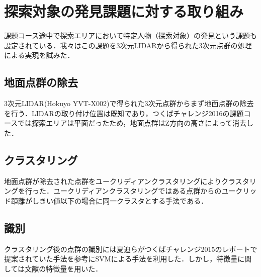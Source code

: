 \documentclass[10pt,a4paper]{jarticle}
\begin{document}
\section{探索対象の発見課題に対する取り組み}
\label{200657_7Dec16}
課題コース途中で探索エリアにおいて特定人物（探索対象）の発見という課題も設定されている．我々はこの課題を3次元LIDARから得られた3次元点群の処理による実現を試みた．

\subsection{地面点群の除去}
3次元LIDAR(Hokuyo YVT-X002)で得られた3次元点群からまず地面点群の除去を行う．LIDARの取り付け位置は既知であり，つくばチャレンジ2016の課題コースでは探索エリアは平面だったため，地面点群はZ方向の高さによって消去した．
\subsection{クラスタリング}
地面点群が除去された点群をユークリディアンクラスタリングによりクラスタリングを行った．ユークリディアンクラスタリングではある点群からのユークリッド距離がしきい値以下の場合に同一クラスタとする手法である．
\subsection{識別}
クラスタリング後の点群の識別には夏迫ら\cite{chibainst2015}がつくばチャレンジ2015のレポートで提案されていた手法を参考にSVMによる手法を利用した．しかし，特徴量に関しては文献\cite{城殿清澄2011高解像度レーザレーダによる歩行者識別}\cite{liukun2015}\cite{tokudome2016}の特徴量を用いた．
\end{document}
